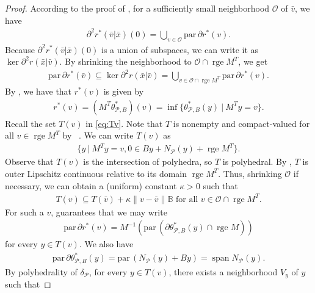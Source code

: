 \documentclass[reqno]{amsart}
\numberwithin{equation}{section}
\newcommand{\pol}{\mathcal{P}}
\newcommand{\tpb}{\theta_{\mathcal{P},B}}
\newcommand{\para}{\mathrm{par}\,}
\newcommand{\rge}{\operatorname{rge}}
\begin{document}
\begin{proof}
    According to the proof of \cite[Theorem 4.1]{RM 11}, for a sufficiently small
    neighborhood $\mathcal{O}$ of $\bar{v}$, we have \begin{align*}
        \partial^2 r^* (\bar{v} | \bar{x})(0) = \bigcup\limits_{v \in \mathcal{O}} \para \partial r^*(v).
    \end{align*} Because $\partial^2 r^*(\bar{v} | \bar{x})(0)$ is a union of subspaces, we can write it as
    $\ker \partial^2 r(\bar{x} | \bar{v})$. By shrinking the neighborhood to $\mathcal{O} \cap \rge M^T$, we get
    \begin{align}\label{eq:parker}
        \para \partial r^*(\bar{v}) \subseteq \ker \partial^2 r(\bar{x} | \bar{v}) = \bigcup\limits_{v \in \mathcal{O} \cap \rge M^T} \para \partial r^* (v).
    \end{align} By \cite[Theorem 11.33]{RoW 98}, we have that $r^*(v)$ is given by \begin{align*}
        r^*(v) = (M^T \tpb^*)(v) = \inf\{ \tpb^*(y) \ | \ M^Ty = v\}.
    \end{align*} Recall the set $T(v)$ in \eqref{eq:Tv}. Note that  $T$ is nonempty and compact-valued for all $v \in \rge M^T$ by ~.
    We can write $T(v)$ as \begin{align*}
        \{y \ |\ M^Ty=v, 0 \in By + N_{\pol}(y) + \rge M^T\}.
    \end{align*}
    Observe that $T(v)$ is the intersection of polyhedra, so $T$ is polyhedral. By \cite[3D]{DoR 14}, $T$ is outer Lipschitz continuous relative to its domain $\rge M^T$.
    Thus, shrinking $\mathcal{O}$ if necessary, we can obtain a (uniform) constant $\kappa > 0$ such that 
    \begin{align}\label{eq:TVV}
        T(v) \subseteq T(\bar{v}) + \kappa \lVert v - \bar{v} \rVert \mathbb{B} \text{ for all } v \in \mathcal{O} \cap \rge M^T.
    \end{align} For such a $v$, \cite[Proposition 4.3]{NVV 25} guarantees that we may write \begin{align*}
        \para \partial r^* (v) = M^{-1}(\para(\partial \tpb^*(y) \cap \rge M))
    \end{align*} for every $y \in T(v)$. We also have \begin{align*}
        \para \partial \tpb^*(y) = \para (N_{\pol}(y) + By) = \operatorname{span} N_{\pol}(y).
    \end{align*} By polyhedrality of $\delta_{\pol}$, for every $y \in T(v)$, there exists a neighborhood $V_y$ of $y$ such that

\end{proof}
\end{document}
